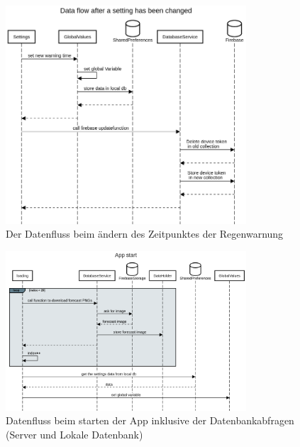 \begin{figure}[H]
 \centering
 \includegraphics[width=0.8\textwidth,angle=0]{abb/sequence_diagram_change_settings}
 \caption[Sequencediagram Einstellungen ändern]{Der Datenfluss beim ändern des Zeitpunktes der Regenwarnung}
\label{fig:sequence_diagram_change_settings}
\end{figure}

\begin{figure}[H]
 \centering
 \includegraphics[width=0.8\textwidth,angle=0]{abb/sequence_diagram_app_start}
 \caption[Sequencediagram Appstart]{Datenfluss beim starten der App inklusive der Datenbankabfragen (Server und Lokale Datenbank)}
\label{fig:sequence_diagram_app_start}
\end{figure}

